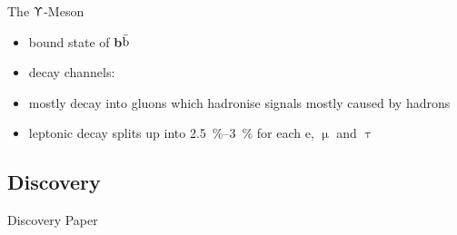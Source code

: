 \begin{frame}{The $\Upupsilon$-Meson}
 
	\begin{itemize}
		\item bound state of \textbf{b$\bar{\text{b}}$}\vspace*{10pt}
		\item decay channels:
	\end{itemize}
	\begin{figure}
	\end{figure}
	\begin{itemize}\itemfill
		\item mostly decay into gluons which hadronise \ra signals mostly caused by hadrons
		\item leptonic decay splits up into \SIrange{2.5}{3}{\%} for each e, $\upmu$ and $\uptau$
	\end{itemize}

\end{frame}


\subsection{Discovery}
\begin{frame}{Discovery Paper}

	
\end{frame}

